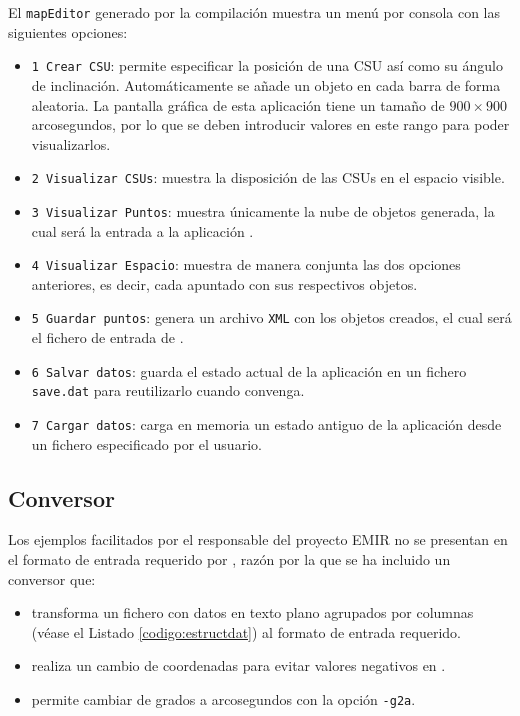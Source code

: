 El \texttt{mapEditor} generado por la compilación muestra un menú por consola
con las siguientes opciones:
\begin{itemize}
\item \texttt{1 Crear CSU}: permite especificar la posición de una CSU así como
su ángulo de inclinación. Automáticamente se añade un objeto en cada barra de
forma aleatoria. La pantalla gráfica de esta aplicación tiene un tamaño de
$900\times900$ arcosegundos, por lo que se deben introducir valores en este
rango para poder visualizarlos.
\item \texttt{2 Visualizar CSUs}: muestra la disposición de las CSUs en el
espacio visible.
\item \texttt{3 Visualizar Puntos}: muestra únicamente la nube de objetos
generada, la cual será la entrada a la aplicación \CSUO{}.
\item \texttt{4 Visualizar Espacio}: muestra de manera conjunta las dos opciones
anteriores, es decir, cada apuntado con sus respectivos objetos.
\item \texttt{5 Guardar puntos}: genera un archivo \texttt{XML} con los objetos
creados, el cual será el fichero de entrada de \CSUO{}.
\item \texttt{6 Salvar datos}: guarda el estado actual de la aplicación en un
fichero \texttt{save.dat} para reutilizarlo cuando convenga.
\item \texttt{7 Cargar datos}: carga en memoria un estado antiguo de la
aplicación desde un fichero especificado por el usuario.
\end{itemize}
\subsection{Conversor} \label{sec:conver}
Los ejemplos facilitados por el responsable del proyecto EMIR no se presentan en
el formato de entrada requerido por \CSUO{}, razón por la que se ha
incluido un conversor que:
\begin{itemize}
\item transforma un fichero con datos en texto plano agrupados por columnas (véase
el Listado \ref{codigo:estructdat}) al formato de entrada requerido.
\item realiza un cambio de coordenadas para evitar valores negativos en
\CSUO{}.
\item permite cambiar de grados a arcosegundos con la opción \texttt{-g2a}.
\end{itemize}


